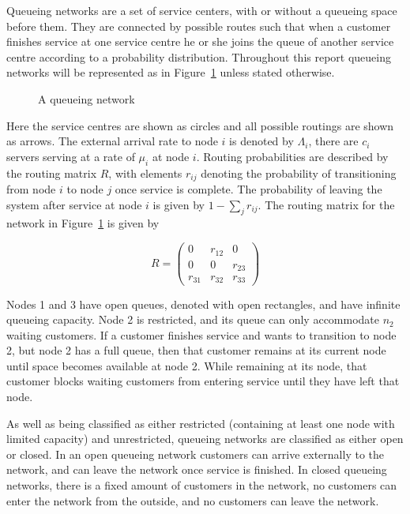 \documentclass{article}
\begin{document}
Queueing networks are a set of service centers, with or without a queueing space before them.
They are connected by possible routes such that when a customer finishes service at one service centre he or she joins the queue of another service centre according to a probability distribution.
Throughout this report queueing networks will be represented as in Figure~\ref{fig:QnetNotation} unless stated otherwise.

\begin{figure}[H]
    
    \caption{A queueing network}
    \label{fig:QnetNotation}
\end{figure}

Here the service centres are shown as circles and all possible routings are shown as arrows.
The external arrival rate to node $i$ is denoted by $\Lambda_i$, there are $c_i$ servers serving at a rate of $\mu_i$ at node $i$.
Routing probabilities are described by the routing matrix $R$, with elements $r_{ij}$ denoting the probability of transitioning from node $i$ to node $j$ once service is complete.
The probability of leaving the system after service at node $i$ is given by $1 - \sum_j r_{ij}$.
The routing matrix for the network in Figure~\ref{fig:QnetNotation} is given by

\begin{equation*}
R = \left(
\begin{matrix}
  0 & r_{12} & 0 \\
  0 & 0 & r_{23} \\
  r_{31} & r_{32} & r_{33}
 \end{matrix}
 \right)
\end{equation*}

Nodes 1 and 3 have open queues, denoted with open rectangles, and have infinite queueing capacity.
Node 2 is restricted, and its queue can only accommodate $n_2$ waiting customers.
If a customer finishes service and wants to transition to node 2, but node 2 has a full queue, then that customer remains at its current node until space becomes available at node 2.
While remaining at its node, that customer blocks waiting customers from
entering service until they have left that node.

As well as being classified as either restricted (containing at least one node with limited capacity) and unrestricted, queueing networks are classified as either open or closed.
In an open queueing network customers can arrive externally to the network, and can leave the network once service is finished.
In closed queueing networks, there is a fixed amount of customers in the network, no customers can enter the network from the outside, and no customers can leave the network.
\end{document}
